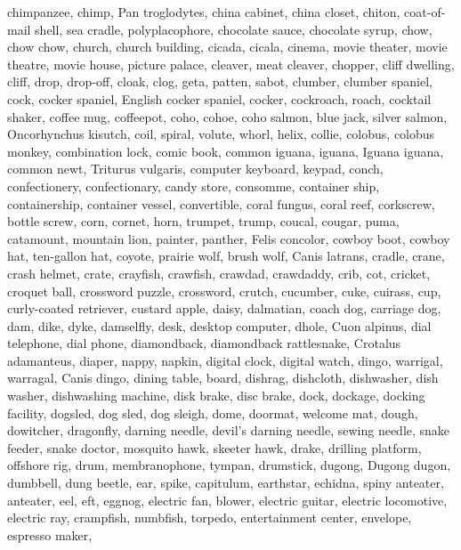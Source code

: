 \documentclass{article}
\begin{document}
{{chimpanzee, chimp, Pan troglodytes},
{china cabinet, china closet},
{chiton, coat-of-mail shell, sea cradle, polyplacophore},
{chocolate sauce, chocolate syrup},
{chow, chow chow},
{church, church building},
{cicada, cicala},
{cinema, movie theater, movie theatre, movie house, picture palace},
{cleaver, meat cleaver, chopper},
{cliff dwelling},
{cliff, drop, drop-off},
{cloak},
{clog, geta, patten, sabot},
{clumber, clumber spaniel},
{cock},
{cocker spaniel, English cocker spaniel, cocker},
{cockroach, roach},
{cocktail shaker},
{coffee mug},
{coffeepot},
{coho, cohoe, coho salmon, blue jack, silver salmon, Oncorhynchus kisutch},
{coil, spiral, volute, whorl, helix},
{collie},
{colobus, colobus monkey},
{combination lock},
{comic book},
{common iguana, iguana, Iguana iguana},
{common newt, Triturus vulgaris},
{computer keyboard, keypad},
{conch},
{confectionery, confectionary, candy store},
{consomme},
{container ship, containership, container vessel},
{convertible},
{coral fungus},
{coral reef},
{corkscrew, bottle screw},
{corn},
{cornet, horn, trumpet, trump},
{coucal},
{cougar, puma, catamount, mountain lion, painter, panther, Felis concolor},
{cowboy boot},
{cowboy hat, ten-gallon hat},
{coyote, prairie wolf, brush wolf, Canis latrans},
{cradle},
{crane},
{crash helmet},
{crate},
{crayfish, crawfish, crawdad, crawdaddy},
{crib, cot},
{cricket},
{croquet ball},
{crossword puzzle, crossword},
{crutch},
{cucumber, cuke},
{cuirass},
{cup},
{curly-coated retriever},
{custard apple},
{daisy},
{dalmatian, coach dog, carriage dog},
{dam, dike, dyke},
{damselfly},
{desk},
{desktop computer},
{dhole, Cuon alpinus},
{dial telephone, dial phone},
{diamondback, diamondback rattlesnake, Crotalus adamanteus},
{diaper, nappy, napkin},
{digital clock},
{digital watch},
{dingo, warrigal, warragal, Canis dingo},
{dining table, board},
{dishrag, dishcloth},
{dishwasher, dish washer, dishwashing machine},
{disk brake, disc brake},
{dock, dockage, docking facility},
{dogsled, dog sled, dog sleigh},
{dome},
{doormat, welcome mat},
{dough},
{dowitcher},
{dragonfly, darning needle, devil's darning needle, sewing needle, snake feeder, snake doctor, mosquito hawk, skeeter hawk},
{drake},
{drilling platform, offshore rig},
{drum, membranophone, tympan},
{drumstick},
{dugong, Dugong dugon},
{dumbbell},
{dung beetle},
{ear, spike, capitulum},
{earthstar},
{echidna, spiny anteater, anteater},
{eel},
{eft},
{eggnog},
{electric fan, blower},
{electric guitar},
{electric locomotive},
{electric ray, crampfish, numbfish, torpedo},
{entertainment center},
{envelope},
{espresso maker},
}
\end{document}
